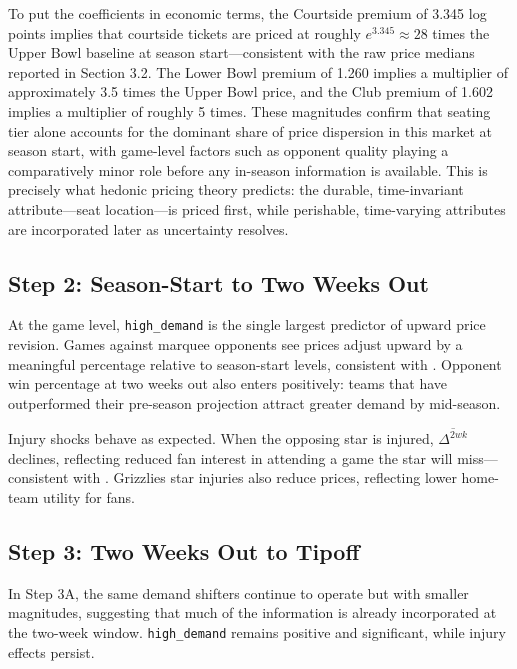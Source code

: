 \documentclass[12pt]{article}
\begin{document}
\medskip

To put the coefficients in economic terms, the Courtside premium of 3.345 log points implies that courtside tickets are priced at roughly $e^{3.345} \approx 28$ times the Upper Bowl baseline at season start---consistent with the raw price medians reported in Section 3.2. The Lower Bowl premium of 1.260 implies a multiplier of approximately 3.5 times the Upper Bowl price, and the Club premium of 1.602 implies a multiplier of roughly 5 times. These magnitudes confirm that seating tier alone accounts for the dominant share of price dispersion in this market at season start, with game-level factors such as opponent quality playing a comparatively minor role before any in-season information is available. This is precisely what hedonic pricing theory predicts: the durable, time-invariant attribute---seat location---is priced first, while perishable, time-varying attributes are incorporated later as uncertainty resolves.
 
 
\subsection{Step 2: Season-Start to Two Weeks Out}
 
At the game level, \texttt{high\_demand} is the single largest predictor of upward price revision. Games against marquee opponents see prices adjust upward by a meaningful percentage relative to season-start levels, consistent with \citet{drayer2012dynamic}. Opponent win percentage at two weeks out also enters positively: teams that have outperformed their pre-season projection attract greater demand by mid-season.
 
Injury shocks behave as expected. When the opposing star is injured, $\overline{\Delta^{2wk}}$ declines, reflecting reduced fan interest in attending a game the star will miss---consistent with \citet{Kaplan2019}. Grizzlies star injuries also reduce prices, reflecting lower home-team utility for fans.
 
\subsection{Step 3: Two Weeks Out to Tipoff}
 
In Step 3A, the same demand shifters continue to operate but with smaller magnitudes, suggesting that much of the information is already incorporated at the two-week window. \texttt{high\_demand} remains positive and significant, while injury effects persist.
 
\end{document}
